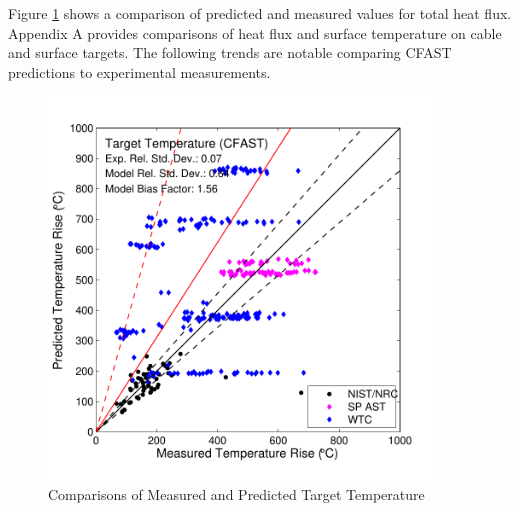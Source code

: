 Figure \ref{fig:Target_Temperature_Scatter} shows a comparison of predicted and measured values for total heat flux. Appendix A provides comparisons of heat flux and surface temperature on cable and surface targets.  The following trends are notable comparing CFAST predictions to experimental measurements.

\begin{figure}
\begin{center}
\includegraphics[width=4in]{FIGURES/ScatterPlots/Target_Temperature}
\end{center}
\caption{Comparisons of Measured and Predicted Target Temperature} \label{fig:Target_Temperature_Scatter}
\end{figure}

